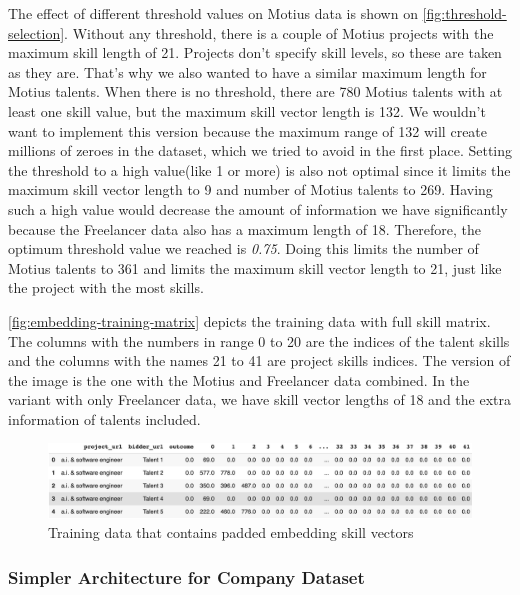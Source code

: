 The effect of different threshold values on Motius data is shown on \autoref{fig:threshold-selection}. Without any threshold, there is a couple of Motius projects with the maximum skill length of 21. Projects don't specify skill levels, so these are taken as they are. That's why we also wanted to have a similar maximum length for Motius talents. When there is no threshold, there are 780 Motius talents with at least one skill value, but the maximum skill vector length is 132. We wouldn't want to implement this version because the maximum range of 132 will create millions of zeroes in the dataset, which we tried to avoid in the first place. Setting the threshold to a high value(like 1 or more) is also not optimal since it limits the maximum skill vector length to 9 and number of Motius talents to 269. Having such a high value would decrease the amount of information we have significantly because the Freelancer data also has a maximum length of 18. Therefore, the optimum threshold value we reached is \textit{0.75}. Doing this limits the number of Motius talents to 361 and limits the maximum skill vector length to 21, just like the project with the most skills.

\autoref{fig:embedding-training-matrix} depicts the training data with full skill matrix. The columns with the numbers in range 0 to 20 are the indices of the talent skills and the columns with the names 21 to 41 are project skills indices.  The version of the image is the one with the Motius and Freelancer data combined. In the variant with only Freelancer data, we have skill vector lengths of 18 and the extra information of talents included.

 \begin{figure}[!ht]
	\centering
	\includegraphics[width=\textwidth]{figures/EmbeddingTrainingMatrix.png}
	\caption{Training data that contains padded embedding skill vectors}
	\label{fig:embedding-training-matrix}
\end{figure}



\subsubsection{Simpler Architecture for Company Dataset}

